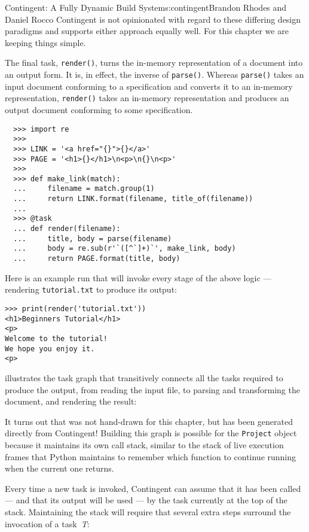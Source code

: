 \begin{aosachapter}{Contingent: A Fully Dynamic Build System}{s:contingent}{Brandon Rhodes and Daniel Rocco}
Contingent is not opinionated with regard to these differing design
paradigms and supports either approach equally well. For this chapter we
are keeping things simple.

The final task, \texttt{render()}, turns the in-memory representation of
a document into an output form. It is, in effect, the inverse of
\texttt{parse()}. Whereas \texttt{parse()} takes an input document
conforming to a specification and converts it to an in-memory
representation, \texttt{render()} takes an in-memory representation and
produces an output document conforming to some specification.

\begin{verbatim}
  >>> import re
  >>>
  >>> LINK = '<a href="{}">{}</a>'
  >>> PAGE = '<h1>{}</h1>\n<p>\n{}\n<p>'
  >>>
  >>> def make_link(match):
  ...     filename = match.group(1)
  ...     return LINK.format(filename, title_of(filename))
  ...
  >>> @task
  ... def render(filename):
  ...     title, body = parse(filename)
  ...     body = re.sub(r'`([^`]+)`', make_link, body)
  ...     return PAGE.format(title, body)
\end{verbatim}

Here is an example run that will invoke every stage of the above logic
--- rendering \texttt{tutorial.txt} to produce its output:

\begin{verbatim}
>>> print(render('tutorial.txt'))
<h1>Beginners Tutorial</h1>
<p>
Welcome to the tutorial!
We hope you enjoy it.
<p>
\end{verbatim}

 illustrates the task graph that
transitively connects all the tasks required to produce the output, from
reading the input file, to parsing and transforming the document, and
rendering the result:


It turns out that  was not hand-drawn
for this chapter, but has been generated directly from Contingent!
Building this graph is possible for the \texttt{Project} object because
it maintains its own call stack, similar to the stack of live execution
frames that Python maintains to remember which function to continue
running when the current one returns.

Every time a new task is invoked, Contingent can assume that it has been
called --- and that its output will be used --- by the task currently at
the top of the stack. Maintaining the stack will require that several
extra steps surround the invocation of a task~\emph{T}:


\end{aosachapter}
